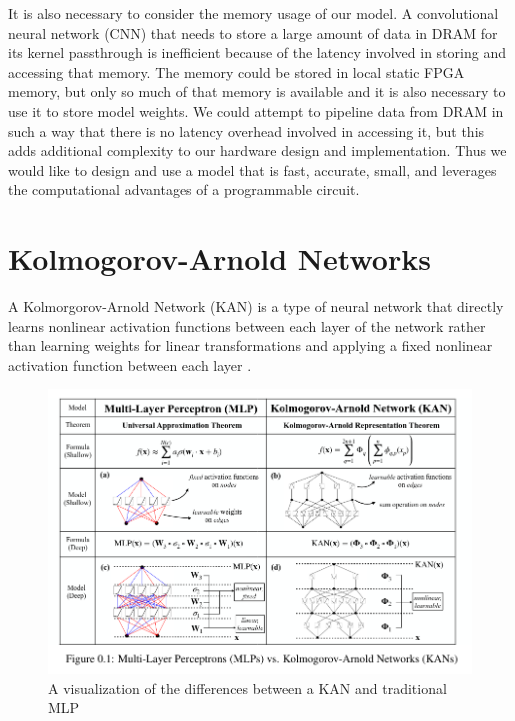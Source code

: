\documentclass[psamsfonts]{amsart}
\newcommand{\mycomment}[1]{}
\theoremstyle{definition}
\theoremstyle{remark}
\numberwithin{equation}{section}
\begin{document}
It is also necessary to consider the memory usage of our model. A convolutional neural network (CNN) that needs to store a large amount of data in DRAM for its kernel passthrough is inefficient because of the latency involved in storing and accessing that memory. The memory could be stored in local static FPGA memory\mycomment{what is a better name for this?}, but only so much of that memory is available and it is also necessary to use it to store model weights. We could attempt to pipeline data from DRAM in such a way that there is no latency overhead involved in accessing it, but this adds additional complexity to our hardware design and implementation. Thus we would like to design and use a model that is fast, accurate, small, and leverages the computational advantages of a programmable circuit.

\section{Kolmogorov-Arnold Networks}
A Kolmorgorov-Arnold Network (KAN) is a type of neural network that directly learns nonlinear activation functions between each layer of the network rather than learning weights for linear transformations and applying a fixed nonlinear activation function between each layer \cite{kan}.

\begin{figure}[H]
  \centering
  \includegraphics[scale=0.5]{mlpkan.png}
  \caption{A visualization of the differences between a KAN and traditional MLP \cite{kan}}
\end{figure}
\end{document}
